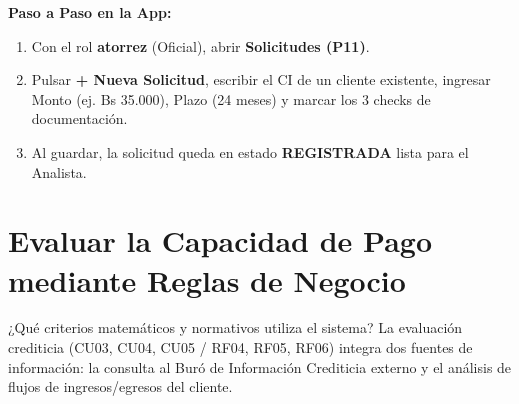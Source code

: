 \documentclass[11pt,letterpaper]{article}
\begin{document}
\begin{demobox}
\textbf{Paso a Paso en la App:}
\begin{enumerate}
    \item Con el rol \textbf{atorrez} (Oficial), abrir \textbf{Solicitudes (P11)}.
    \item Pulsar \textbf{+ Nueva Solicitud}, escribir el CI de un cliente existente, ingresar Monto (ej. Bs 35.000), Plazo (24 meses) y marcar los 3 checks de documentación.
    \item Al guardar, la solicitud queda en estado \textbf{REGISTRADA} lista para el Analista.
\end{enumerate}
\end{demobox}

\section{Evaluar la Capacidad de Pago mediante Reglas de Negocio}

\begin{respuestabox}{¿Qué criterios matemáticos y normativos utiliza el sistema?}
La evaluación crediticia (CU03, CU04, CU05 / RF04, RF05, RF06) integra dos fuentes de información: la consulta al Buró de Información Crediticia externo y el análisis de flujos de ingresos/egresos del cliente.
\end{respuestabox}
\end{document}
